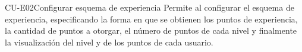 
%

\begin{UseCase}%
%
{CU-E02}{Configurar esquema de experiencia}{%
%
 Permite al  configurar el esquema de experiencia, especificando
 la forma en que se obtienen los puntos de experiencia, la cantidad de puntos a otorgar, 
 el número de puntos de cada nivel y finalmente la visualización del nivel y de los puntos
 de cada usuario.}




	
	

\end{UseCase}
